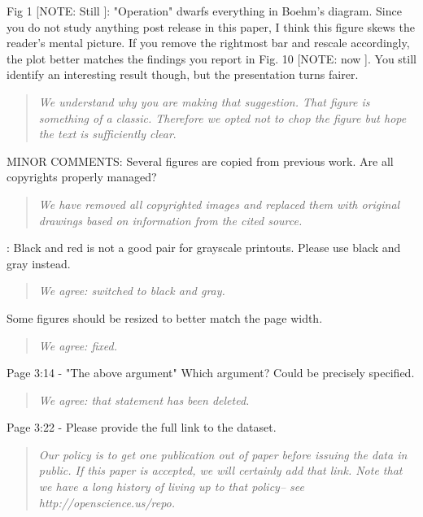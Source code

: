  
Fig 1 [NOTE: Still ]: "Operation" dwarfs everything in Boehm's diagram.
Since you do not study anything post release in this paper,
I think this figure skews the reader's mental picture. If
you remove the rightmost bar and rescale accordingly, the
plot better matches the findings you report in Fig. 10 [NOTE: now ]. You
still identify an interesting result though, but the
presentation turns fairer. 

\begin{quote}{\em We understand why you are making that suggestion.
That figure is something of a classic. Therefore we opted not to chop the figure but hope the text is sufficiently clear}.
\end{quote}

MINOR COMMENTS: 
Several figures are copied from previous work. Are all copyrights properly
managed?  

\begin{quote}{\em We have removed all copyrighted images and replaced them with original drawings based on information from the cited source.}\end{quote}

 

: Black and red is not a good pair for
grayscale printouts. Please use black and gray instead.
\begin{quote}{\em  We agree: switched to black and gray.  }\end{quote}

 
 
Some figures should be resized to better match the page width.  
 

\begin{quote}{\em  We agree: fixed. }\end{quote}


 
Page 3:14 - "The above argument" Which argument? Could be precisely specified.
 

\begin{quote}{\em  We agree: that statement has been deleted. }\end{quote}
 
Page 3:22 - Please provide the full link to the dataset.
 
\begin{quote}{\em  Our policy is to get one publication out of paper
before issuing the data in public. If this paper is accepted, we will certainly add that link. Note that we have a long history of living up to that policy-- see http://openscience.us/repo. }\end{quote}  

